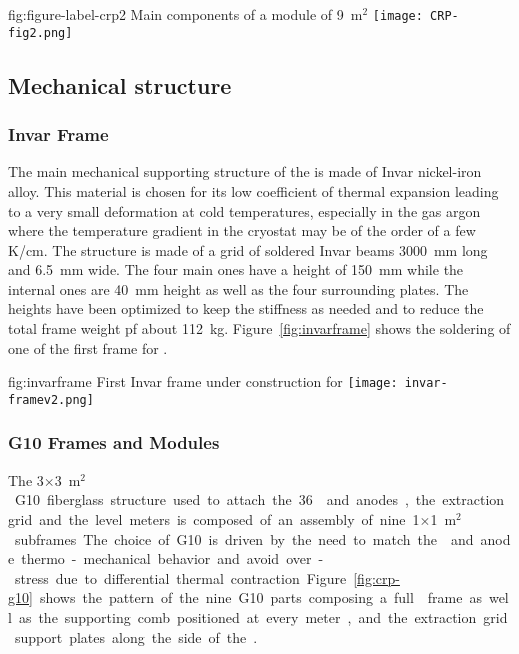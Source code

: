 \begin{dunefigure}{fig:figure-label-crp2}
{Main components of a  module of  \SI{9}{m$^{2}$}}
\texttt{[image: CRP-fig2.png]}
\end{dunefigure}

\subsection{Mechanical structure}
\label{sec:fddp-crp-mechanics}
\subsubsection{Invar Frame}

The main mechanical supporting structure of the  is made of Invar nickel-iron alloy. This material is chosen for its low coefficient of thermal expansion leading to a very small deformation at cold temperatures, especially in the gas argon where the temperature gradient in the cryostat may be of the order of a few \si{K/cm}.
The structure is made of a grid of soldered Invar beams \SI{3000}{mm} long and \SI{6.5}{mm} wide. The four main ones have a height of \SI{150}{mm} while the internal ones are \SI{40}{mm} height as well as the four surrounding plates. The heights have been optimized to keep the stiffness as needed and to reduce the total frame weight pf %
 about \SI{112}{kg}.
Figure~\ref{fig:invarframe} shows the soldering of one of the first  frame for .

\begin{dunefigure}{fig:invarframe}
{First  Invar frame under construction for }
\texttt{[image: invar-framev2.png]}
\end{dunefigure}

\subsubsection{G10 Frames and Modules}
\label{sec:invar-frame}

The \num{3}$\times$\SI{3}{m$^{2}$}  G10 fiberglass structure used to attach the \num{36}  and anodes, the extraction grid and the level meters is composed of an assembly of nine \num{1}$\times$\SI{1}{m$^{2}$} subframes. The choice of G10 is driven by the need to match the  and anode thermo-mechanical behavior and avoid over-stress due to differential thermal contraction. 
Figure~\ref{fig:crp-g10} shows the pattern of the nine G10 parts composing a full  frame as well as the supporting comb positioned at every meter, and the extraction grid support plates along the side of the .

